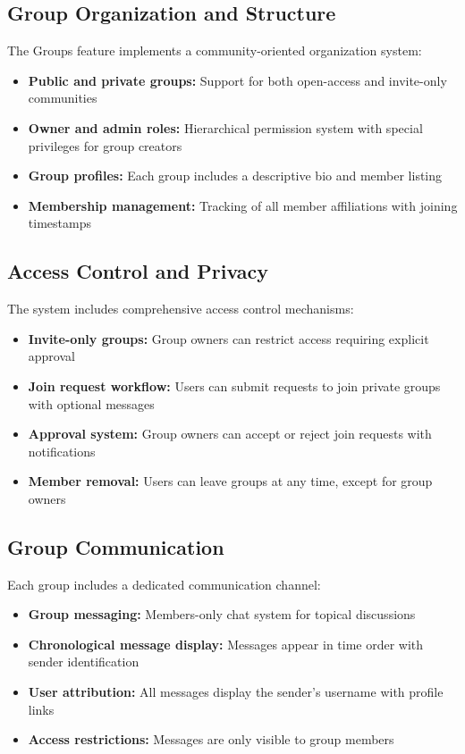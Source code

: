 \documentclass{article}
\begin{document}
\subsection{Group Organization and Structure}
The Groups feature implements a community-oriented organization system:
\begin{itemize}
    \item \textbf{Public and private groups:} Support for both open-access and invite-only communities
    \item \textbf{Owner and admin roles:} Hierarchical permission system with special privileges for group creators
    \item \textbf{Group profiles:} Each group includes a descriptive bio and member listing
    \item \textbf{Membership management:} Tracking of all member affiliations with joining timestamps
\end{itemize}

\subsection{Access Control and Privacy}
The system includes comprehensive access control mechanisms:
\begin{itemize}
    \item \textbf{Invite-only groups:} Group owners can restrict access requiring explicit approval
    \item \textbf{Join request workflow:} Users can submit requests to join private groups with optional messages
    \item \textbf{Approval system:} Group owners can accept or reject join requests with notifications
    \item \textbf{Member removal:} Users can leave groups at any time, except for group owners
\end{itemize}

\subsection{Group Communication}
Each group includes a dedicated communication channel:
\begin{itemize}
    \item \textbf{Group messaging:} Members-only chat system for topical discussions
    \item \textbf{Chronological message display:} Messages appear in time order with sender identification
    \item \textbf{User attribution:} All messages display the sender's username with profile links
    \item \textbf{Access restrictions:} Messages are only visible to group members
\end{itemize}
\end{document}
